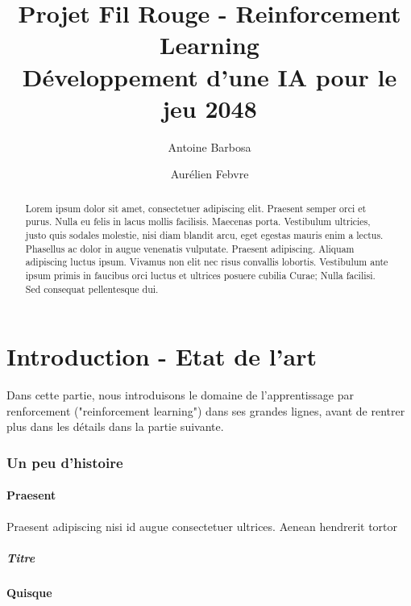 \documentclass[a4paper]{article}
\title{Projet Fil Rouge - Reinforcement Learning\\Développement d'une IA pour
       le jeu 2048}           %
\author{Antoine Barbosa \and Aurélien Febvre}
\date{}                       %
\begin{document}
\maketitle                    %


\begin{abstract}
Lorem ipsum dolor sit amet, consectetuer adipiscing elit. Praesent semper orci
et purus. Nulla eu felis in lacus mollis facilisis. Maecenas porta. Vestibulum
ultricies, justo quis sodales molestie, nisi diam blandit arcu, eget egestas
mauris enim a lectus. Phasellus ac dolor in augue venenatis vulputate. Praesent
adipiscing. Aliquam adipiscing luctus ipsum. Vivamus non elit nec risus
convallis lobortis. Vestibulum ante ipsum primis in faucibus orci luctus et
ultrices posuere cubilia Curae; Nulla facilisi. Sed consequat pellentesque dui.
\end{abstract}

\tableofcontents              %
\pagebreak

\part{Introduction - Etat de l'art}

Dans cette partie, nous introduisons le domaine de l'apprentissage par
renforcement ("reinforcement learning") dans ses grandes lignes, avant de
rentrer plus dans les détails dans la partie suivante.

\section{Un peu d'histoire}


\subsection{Praesent}

Praesent adipiscing nisi id augue consectetuer ultrices. Aenean hendrerit tortor

\subsubsection{Titre}

\subsection{Quisque}
\end{document}
